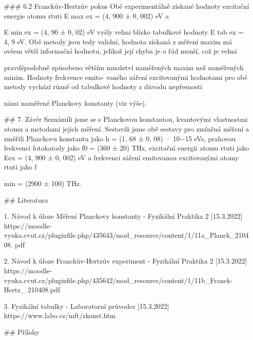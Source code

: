 \documentclass{article}
\begin{document}
### 6.2 Franckův-Hertzův pokus
Obě experimentálně získané hodnoty excitační energie atomu rtuti E
max
ex = (4, 900 ± 0, 002) eV a

E
min
ex = (4, 90 ± 0, 02) eV vyšly velmi blízko tabulkové hodnoty E
tab
ex = 4, 9 eV. Obě metody jsou tedy validní,
hodnota získaná z měření maxim má ovšem větší informační hodnotu, jelikož její chyba je o řád menší, což je velmi

pravděpodobně způsobeno větším množství naměřených maxim než naměřených minim. Hodnoty frekvence emito-
vaného záření excitovanými hodnotami pro obě metody vychází různě od tabulkové hodnoty z důvodu nepřesnosti

námi naměřené Planckovy konstanty (viz výše).


## 7. Závěr
Seznámili jsme se s Planckovou konstantou, kvantovými vlastnostmi atomu a metodami jejich měření. Sestavili
jsme obě sestavy pro zmíněná měření a změřili Planckovu konstantu jako h = (1, 68 ± 0, 08) · 10−15 eVs, prahovou
frekvenci fotokatody jako f0 = (360 ± 20) THz, excitační energii atomu rtuti jako Eex = (4, 900 ± 0, 002) eV a
frekvenci záření emitovanou excitovanými atomy rtuti jako f

min = (2900 ± 100) THz.


## Literatura

1. Návod k úloze Měření Planckovy konstanty - Fyzikální Praktika 2 [15.3.2022]
https://moodle-vyuka.cvut.cz/pluginfile.php/435643/mod_resource/content/1/11a_Planck_210408.
pdf

2. Návod k úloze Franckův-Hertzův experiment - Fyzikální Praktika 2 [15.3.2022]
https://moodle-vyuka.cvut.cz/pluginfile.php/435642/mod_resource/content/1/11b_Franck-Hertz_
210408.pdf

3. Fyzikální tabulky - Laboratorní průvodce [15.3.2022]
https://www.labo.cz/mft/zkonst.htm


## Přílohy 
\end{document}
